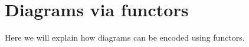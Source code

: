 
\section{Diagrams via functors}

Here we will explain how diagrams can be encoded using functors. 
